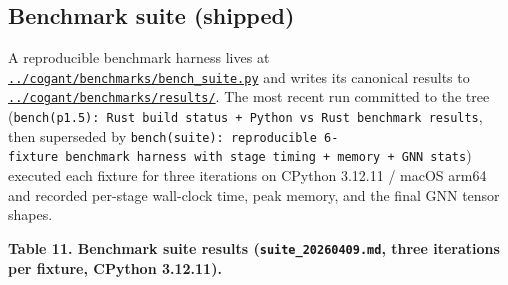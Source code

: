 \documentclass[
]{article}
\begin{document}
\subsection{Benchmark suite (shipped)}\label{benchmark-suite-shipped}

A reproducible benchmark harness lives at
\href{../cogant/benchmarks/bench_suite.py}{\texttt{../cogant/benchmarks/bench\_suite.py}}
and writes its canonical results to
\href{../cogant/benchmarks/results/}{\texttt{../cogant/benchmarks/results/}}.
The most recent run committed to the tree
(\texttt{bench(p1.5):\ Rust\ build\ status\ +\ Python\ vs\ Rust\ benchmark\ results},
then superseded by
\texttt{bench(suite):\ reproducible\ 6-fixture\ benchmark\ harness\ with\ stage\ timing\ +\ memory\ +\ GNN\ stats})
executed each fixture for three iterations on CPython 3.12.11 / macOS
arm64 and recorded per-stage wall-clock time, peak memory, and the final
GNN tensor shapes.

\textbf{Table 11. Benchmark suite results (\texttt{suite\_20260409.md},
three iterations per fixture, CPython 3.12.11).}
\end{document}
